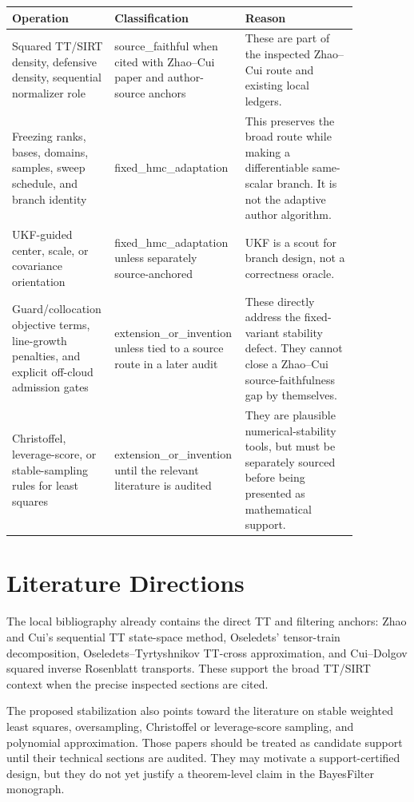 \documentclass[11pt]{article}
\begin{document}
\begin{center}
\begin{tabular}{p{0.25\linewidth}p{0.29\linewidth}p{0.32\linewidth}}
\toprule
Operation & Classification & Reason \\
\midrule
Squared TT/SIRT density, defensive density, sequential normalizer role &
source\_faithful when cited with Zhao--Cui paper and author-source anchors &
These are part of the inspected Zhao--Cui route and existing local ledgers. \\
Freezing ranks, bases, domains, samples, sweep schedule, and branch identity &
fixed\_hmc\_adaptation &
This preserves the broad route while making a differentiable same-scalar
branch.  It is not the adaptive author algorithm. \\
UKF-guided center, scale, or covariance orientation &
fixed\_hmc\_adaptation unless separately source-anchored &
UKF is a scout for branch design, not a correctness oracle. \\
Guard/collocation objective terms, line-growth penalties, and explicit
off-cloud admission gates &
extension\_or\_invention unless tied to a source route in a later audit &
These directly address the fixed-variant stability defect.  They cannot close
a Zhao--Cui source-faithfulness gap by themselves. \\
Christoffel, leverage-score, or stable-sampling rules for least squares &
extension\_or\_invention until the relevant literature is audited &
They are plausible numerical-stability tools, but must be separately sourced
before being presented as mathematical support. \\
\bottomrule
\end{tabular}
\end{center}

\section{Literature Directions}

The local bibliography already contains the direct TT and filtering anchors:
Zhao and Cui's sequential TT state-space method, Oseledets' tensor-train
decomposition, Oseledets--Tyrtyshnikov TT-cross approximation, and
Cui--Dolgov squared inverse Rosenblatt transports.  These support the broad
TT/SIRT context when the precise inspected sections are cited.

The proposed stabilization also points toward the literature on stable
weighted least squares, oversampling, Christoffel or leverage-score sampling,
and polynomial approximation.  Those papers should be treated as candidate
support until their technical sections are audited.  They may motivate a
support-certified design, but they do not yet justify a theorem-level claim in
the BayesFilter monograph.
\end{document}
